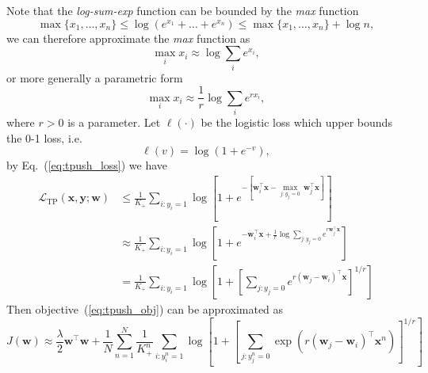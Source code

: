 \documentclass[9pt]{extarticle}
\newcommand{\x}{\mathbf{x}}
\newcommand{\y}{\mathbf{y}}
\newcommand{\1}{\mathbf{1}}
\newcommand{\w}{\mathbf{w}}
\newcommand{\LCal}{\mathcal{L}}
\newcommand{\ie}{i.e.\ }
\begin{document}
Note that the \emph{log-sum-exp} function can be bounded by the \emph{max} function~\cite[p. 72]{boyd2004convex}
$$
\max\{x_1, \dots, x_n\} \le \log(e^{x_1} + \dots + e^{x_n}) \le \max\{x_1, \dots, x_n\} + \log n,
$$
we can therefore approximate the \emph{max} function as
$$
\max_i x_i \approx \log \sum_i e^{x_i},
$$
or more generally a parametric form
$$
\max_i x_i \approx \frac{1}{r} \log \sum_i e^{r x_i},
$$
where $r > 0$ is a parameter.
%
Let $\ell(\cdot)$ be the logistic loss which upper bounds the 0-1 loss, \ie 
$$
\ell(v) = \log(1 + e^{-v}),
$$
by Eq.~(\ref{eq:tpush_loss}) we have
\begin{equation}
\label{eq:tpush_loss_approx}
\begin{aligned}
\LCal_\text{TP}(\x, \y; \w)
&\le \frac{1}{K_+} \sum_{i:y_i=1}
     \log \left[ 1 + e^{- \left[ \w_i^\top \x - \underset{j:y_j=0}{\max} \, \w_j^\top \x \right]} \right] \\
&\approx \frac{1}{K_+} \sum_{i:y_i=1}
         \log \left[ 1 + e^{-\w_i^\top \x + \frac{1}{r} \log \underset{j:y_j=0}{\sum} e^{r \w_j^\top \x}} \right] \\
&= \frac{1}{K_+} \sum_{i:y_i=1}
   \log \left[ 1 + \left[ \underset{j:y_j=0}{\sum} e^{r (\w_j - \w_i)^\top \x} \right]^{1/r} \right]
\end{aligned}
\end{equation}
Then objective~(\ref{eq:tpush_obj}) can be approximated as
\begin{equation}
\label{eq:tpush_obj_approx}
J(\w) \approx \frac{\lambda}{2} \w^\top \w + \frac{1}{N} \sum_{n=1}^N \frac{1}{K_+^n} \sum_{i:y_i^n=1}
              \log \left[ 1 + \left[ \underset{j:y_j^n=0}{\sum} \exp \left( r (\w_j - \w_i)^\top \x^n \right) \right]^{1/r} \right]
\end{equation}
\end{document}
